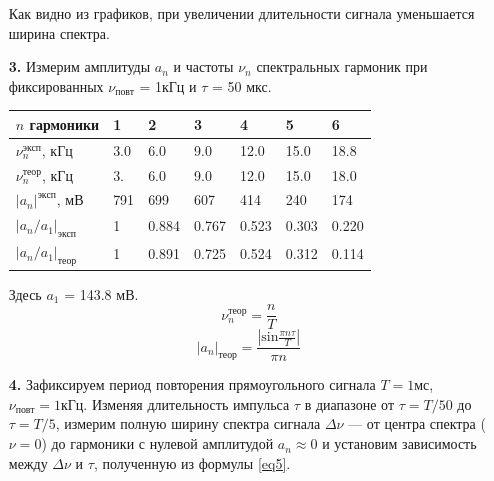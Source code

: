 \documentclass[a4paper,12pt]{article}
\theoremstyle{definition}
\begin{document}
\begin{enumerate}
Как видно из графиков, при увеличении длительности сигнала уменьшается ширина спектра.

\item [\textbf{3.}] Измерим амплитуды $a_n$ и частоты $\nu_n$ спектральных гармоник при фиксированных $\nu_\text{повт}$ = 1кГц и $\tau$ = 50 мкс.

\begin{table}[!h]
\centering
\begin{tabular}{|l|l|l|l|l|l|l|}
\hline
$n$ гармоники & 1 & 2 & 3 & 4 & 5 & 6\\ \hline
$\nu_n^\text{эксп}$, кГц & 3.0 & 6.0 & 9.0 & 12.0 & 15.0 & 18.8 \\ \hline
$\nu_n^\text{теор}$, кГц & 3. & 6.0 & 9.0 & 12.0 & 15.0 & 18.0 \\ \hline
$|a_n|^\text{эксп}$, мВ & 791 & 699 & 607 & 414 & 240 & 174\\ \hline
$|a_n/a_1|_\text{эксп}$ & 1 & 0.884 & 0.767 & 0.523 & 0.303 & 0.220 \\ \hline
$|a_n/a_1|_\text{теор}$ & 1 & 0.891 & 0.725 & 0.524 & 0.312 & 0.114\\ \hline
\end{tabular}
\end{table}

Здесь $a_1$ = 143.8 мВ.
$$\nu_n^\text{теор} = \frac{n}{T}$$
$$|a_n|_\text{теор} = \frac{|\text{sin}\frac{\pi n \tau}{T}|}{\pi n}$$

\item[\textbf{4.}] Зафиксируем период повторения прямоугольного сигнала $T = 1 \text{мс}$, $\nu_\text{повт} = 1\text{кГц}$. Изменяя длительность импульса $\tau$ в диапазоне от
$\tau=T/50$ до $\tau=T/5$, измерим полную ширину спектра сигнала $\Delta \nu$ — от центра спектра ($\nu = 0$) до гармоники с нулевой амплитудой $a_n \approx 0$ и установим зависимость между $\Delta \nu$ и $\tau$, полученную из формулы \ref{eq5}.


\end{enumerate}
\end{document}
